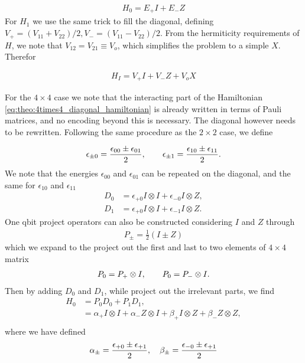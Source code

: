 \begin{align*}
    H_0 = E_+ I + E_- Z
\end{align*}
For $H_1$ we use the same trick to fill the diagonal, defining $V_+ = (V_{11} + V_{22})/2, V_- = (V_{11} - V_{22})/2$. From the hermiticity requirements of $H$, we note that $V_{12} = V_{21} \equiv V_o$, which simplifies the problem to a simple $X$. Therefor

\begin{align*}
    H_I = V_+ I + V_- Z + V_o X
\end{align*}

For the $4 \times 4$ case we note that the interacting part of the Hamiltonian \cref{eq:theo:4times4_diagonal_hamiltonian} is already written in terms of Pauli matrices, and no encoding beyond this is necessary. The diagonal however needs to be rewritten. Following the same procedure as the $2 \times 2$ case, we define

\begin{align*}
    \epsilon_{\pm 0} = \frac{\epsilon_{00}\pm\epsilon_{01}}{2},\hspace{20px}\epsilon_{\pm 1} = \frac{\epsilon_{10}\pm\epsilon_{11}}{2}.
\end{align*}
We note that the energies $\epsilon_{00}$ and $\epsilon_{01}$ can be repeated on the diagonal, and the same for $\epsilon_{10}$ and $\epsilon_{11}$
\begin{align*}
    D_{0} &= \epsilon_{+0} I\otimes I + \epsilon_{-0} I\otimes Z, \\
    D_{1} &= \epsilon_{+0} I\otimes I + \epsilon_{-1} I\otimes Z.
\end{align*}
One qbit project operators can also be constructed considering $I$ and $Z$ through
\begin{align*}
    P_{\pm} = \frac{1}{2}(I \pm Z)
\end{align*}
which we expand to the project out the first and last to two elements of $4\times 4$ matrix
\begin{align*}
    P_0 = P_+ \otimes I,\hspace{20px}P_0 = P_- \otimes I.
\end{align*}
Then by adding $D_0$ and $D_1$, while project out the irrelevant parts, we find
\begin{align*}
    H_0 &= P_0 D_0 + P_1 D_1, \\
    &= \alpha_+ I \otimes I + \alpha_- Z \otimes I + \beta_+ I \otimes Z + \beta_- Z \otimes Z, \\ 
\end{align*}
where we have defined
\begin{align*}
    \alpha_\pm = \frac{\epsilon_{+0}\pm\epsilon_{+1}}{2}, \hspace{10px} \beta_\pm = \frac{\epsilon_{-0}\pm\epsilon_{+1}}{2}
\end{align*}
